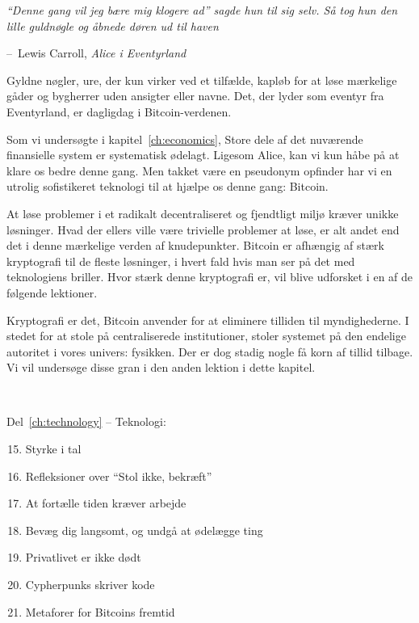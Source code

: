 \documentclass[paper=6in:9in,pagesize=pdftex,
               headinclude=on,footinclude=on,12pt]{scrbook}
\makeatletter
\newenvironment{chapquote}[2][4em]{\setlength{\@tempdima}{#1}%
   \def\chapquote@author{#2}%
   \parshape 1 \@tempdima \dimexpr\textwidth-2\@tempdima\relax%
   \itshape}{\par\normalfont\hfill--\ \chapquote@author\hspace*{\@tempdima}\par\bigskip}
\makeatother
\begin{document}
\begin{chapquote}{Lewis Carroll, \textit{Alice i Eventyrland}} \enquote{Denne gang vil jeg bære mig klogere ad} sagde hun til sig selv. Så tog hun den lille guldnøgle og åbnede døren ud til haven \end{chapquote}

Gyldne nøgler, ure, der kun virker ved et tilfælde, kapløb for at løse mærkelige gåder og bygherrer uden ansigter eller navne. Det, der lyder som eventyr fra Eventyrland, er dagligdag i Bitcoin-verdenen.

Som vi undersøgte i kapitel~\ref{ch:economics}, Store dele af det nuværende finansielle system er systematisk ødelagt. Ligesom Alice, kan vi kun håbe på at klare os bedre denne gang. Men takket være en pseudonym opfinder har vi en utrolig sofistikeret teknologi til at hjælpe os denne gang: Bitcoin.

At løse problemer i et radikalt decentraliseret og fjendtligt miljø kræver unikke løsninger. Hvad der ellers ville være trivielle problemer at løse, er alt andet end det i denne mærkelige verden af knudepunkter. Bitcoin er afhængig af stærk kryptografi til de fleste løsninger, i hvert fald hvis man ser på det med teknologiens briller. Hvor stærk denne kryptografi er, vil blive udforsket i en af de følgende lektioner.

Kryptografi er det, Bitcoin anvender for at eliminere tilliden til myndighederne. I stedet for at stole på centraliserede institutioner, stoler systemet på den endelige autoritet i vores univers: fysikken. Der er dog stadig nogle få korn af tillid tilbage. Vi vil undersøge disse gran i den anden lektion i dette kapitel.

~\begin{samepage} Del~\ref{ch:technology} -- Teknologi:\begin{enumerate}
  \setcounter{enumi}{14}
  \item Styrke i tal \item Refleksioner over \enquote{Stol ikke, bekræft} \item At fortælle tiden kræver arbejde \item Bevæg dig langsomt, og undgå at ødelægge ting \item Privatlivet er ikke dødt \item Cypherpunks skriver kode \item Metaforer for Bitcoins fremtid \end{enumerate}
\end{samepage}
\end{document}
